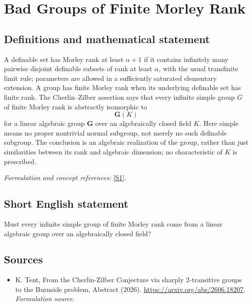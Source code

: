 \documentclass[11pt]{article}
\begin{document}
\section*{\texorpdfstring{Bad Groups of Finite Morley Rank}{Bad Groups of Finite Morley Rank}}\label{30002259}
\subsection{Definitions and mathematical statement}
A definable set has Morley rank at least $\alpha+1$ if it contains infinitely many pairwise disjoint definable subsets of rank at least $\alpha$, with the usual transfinite limit rule; parameters are allowed in a sufficiently saturated elementary extension. A group has finite Morley rank when its underlying definable set has finite rank. The Cherlin--Zilber assertion says that every infinite simple group $G$ of finite Morley rank is abstractly isomorphic to
\[
 \mathbf G(K)
\]
for a linear algebraic group $\mathbf G$ over an algebraically closed field $K$. Here simple means no proper nontrivial normal subgroup, not merely no such definable subgroup. The conclusion is an algebraic realization of the group, rather than just similarities between its rank and algebraic dimension; no characteristic of $K$ is prescribed.
\par\smallskip\textit{Formulation and concept references:} \href{https://arxiv.org/abs/2606.18207}{[S1]}.

\subsection{Short English statement}
Must every infinite simple group of finite Morley rank come from a linear algebraic group over an algebraically closed field?
\subsection{Sources}
\begin{itemize}
\item[S1]K. Tent, From the Cherlin-Zilber Conjecture via sharply 2-transitive groups to the Burnside problem, Abstract (2026).
\url{https://arxiv.org/abs/2606.18207}.
\textit{Formulation source.}
\end{itemize}
\end{document}
